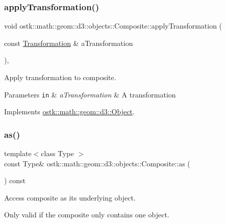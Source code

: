 \subsubsection{\texorpdfstring{apply\+Transformation()}{applyTransformation()}}
{\footnotesize\ttfamily void ostk\+::math\+::geom\+::d3\+::objects\+::\+Composite\+::apply\+Transformation (\begin{DoxyParamCaption}\item[{const \hyperlink{classostk_1_1math_1_1geom_1_1d3_1_1_transformation}{Transformation} \&}]{a\+Transformation }\end{DoxyParamCaption})\hspace{0.3cm}{\ttfamily [override]}, {\ttfamily [virtual]}}



Apply transformation to composite. 


\begin{DoxyParams}[1]{Parameters}
\mbox{\tt in}  & {\em a\+Transformation} & A transformation \\
\hline
\end{DoxyParams}


Implements \hyperlink{classostk_1_1math_1_1geom_1_1d3_1_1_object_ae9194dd6d2bb4df09292ffc84dccdb1d}{ostk\+::math\+::geom\+::d3\+::\+Object}.

\mbox{\label{classostk_1_1math_1_1geom_1_1d3_1_1objects_1_1_composite_a183fda79f9c329411533a390c77885ef}} 
\subsubsection{\texorpdfstring{as()}{as()}}
{\footnotesize\ttfamily template$<$class Type $>$ \\
const Type\& ostk\+::math\+::geom\+::d3\+::objects\+::\+Composite\+::as (\begin{DoxyParamCaption}{ }\end{DoxyParamCaption}) const\hspace{0.3cm}{\ttfamily [inline]}}



Access composite as its underlying object. 

Only valid if the composite only contains one object.

